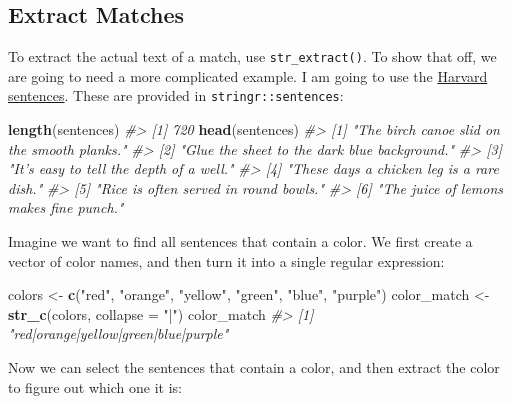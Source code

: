 \documentclass[
]{book}
\newenvironment{Shaded}{\begin{snugshade}}{\end{snugshade}}
\newcommand{\CommentTok}[1]{\textcolor[rgb]{0.56,0.35,0.01}{\textit{#1}}}
\newcommand{\DataTypeTok}[1]{\textcolor[rgb]{0.13,0.29,0.53}{#1}}
\newcommand{\KeywordTok}[1]{\textcolor[rgb]{0.13,0.29,0.53}{\textbf{#1}}}
\newcommand{\NormalTok}[1]{#1}
\newcommand{\StringTok}[1]{\textcolor[rgb]{0.31,0.60,0.02}{#1}}
\begin{document}
\hypertarget{extract-matches}{%
\subsection{Extract Matches}\label{extract-matches}}

To extract the actual text of a match, use \texttt{str\_extract()}. To show that off, we are going to need a more complicated example. I am going to use the \href{https://en.wikipedia.org/wiki/Harvard_sentences}{Harvard sentences}. These are provided in \texttt{stringr::sentences}:

\begin{Shaded}
\begin{Highlighting}[]
\KeywordTok{length}\NormalTok{(sentences)}
\CommentTok{#> [1] 720}
\KeywordTok{head}\NormalTok{(sentences)}
\CommentTok{#> [1] "The birch canoe slid on the smooth planks." }
\CommentTok{#> [2] "Glue the sheet to the dark blue background."}
\CommentTok{#> [3] "It's easy to tell the depth of a well."     }
\CommentTok{#> [4] "These days a chicken leg is a rare dish."   }
\CommentTok{#> [5] "Rice is often served in round bowls."       }
\CommentTok{#> [6] "The juice of lemons makes fine punch."}
\end{Highlighting}
\end{Shaded}

Imagine we want to find all sentences that contain a color. We first create a vector of color names, and then turn it into a single regular expression:

\begin{Shaded}
\begin{Highlighting}[]
\NormalTok{colors <-}\StringTok{ }\KeywordTok{c}\NormalTok{(}\StringTok{"red"}\NormalTok{, }\StringTok{"orange"}\NormalTok{, }\StringTok{"yellow"}\NormalTok{, }\StringTok{"green"}\NormalTok{, }\StringTok{"blue"}\NormalTok{, }\StringTok{"purple"}\NormalTok{)}
\NormalTok{color_match <-}\StringTok{ }\KeywordTok{str_c}\NormalTok{(colors, }\DataTypeTok{collapse =} \StringTok{"|"}\NormalTok{)}
\NormalTok{color_match}
\CommentTok{#> [1] "red|orange|yellow|green|blue|purple"}
\end{Highlighting}
\end{Shaded}

Now we can select the sentences that contain a color, and then extract the color to figure out which one it is:
\end{document}
